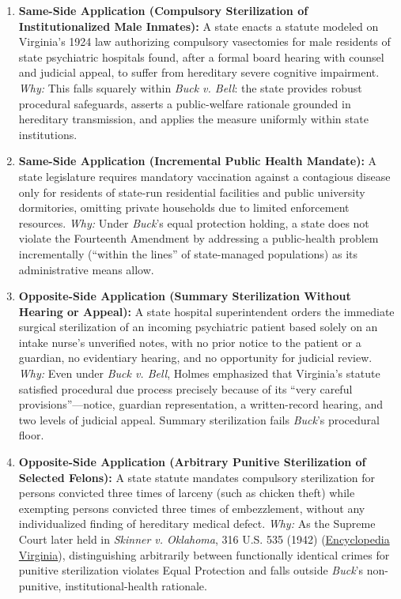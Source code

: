 \documentclass[12pt]{article}
\begin{document}
\begin{enumerate}
  \item \textbf{Same-Side Application (Compulsory Sterilization of Institutionalized Male Inmates):} A state enacts a statute modeled on Virginia's 1924 law authorizing compulsory vasectomies for male residents of state psychiatric hospitals found, after a formal board hearing with counsel and judicial appeal, to suffer from hereditary severe cognitive impairment. \textit{Why:} This falls squarely within \textit{Buck v. Bell}: the state provides robust procedural safeguards, asserts a public-welfare rationale grounded in hereditary transmission, and applies the measure uniformly within state institutions.

  \item \textbf{Same-Side Application (Incremental Public Health Mandate):} A state legislature requires mandatory vaccination against a contagious disease only for residents of state-run residential facilities and public university dormitories, omitting private households due to limited enforcement resources. \textit{Why:} Under \textit{Buck}'s equal protection holding, a state does not violate the Fourteenth Amendment by addressing a public-health problem incrementally (``within the lines'' of state-managed populations) as its administrative means allow.

  \item \textbf{Opposite-Side Application (Summary Sterilization Without Hearing or Appeal):} A state hospital superintendent orders the immediate surgical sterilization of an incoming psychiatric patient based solely on an intake nurse's unverified notes, with no prior notice to the patient or a guardian, no evidentiary hearing, and no opportunity for judicial review. \textit{Why:} Even under \textit{Buck v. Bell}, Holmes emphasized that Virginia's statute satisfied procedural due process precisely because of its ``very careful provisions''---notice, guardian representation, a written-record hearing, and two levels of judicial appeal. Summary sterilization fails \textit{Buck}'s procedural floor.

  \item \textbf{Opposite-Side Application (Arbitrary Punitive Sterilization of Selected Felons):} A state statute mandates compulsory sterilization for persons convicted three times of larceny (such as chicken theft) while exempting persons convicted three times of embezzlement, without any individualized finding of hereditary medical defect. \textit{Why:} As the Supreme Court later held in \textit{Skinner v. Oklahoma}, 316 U.S. 535 (1942) (\href{https://encyclopediavirginia.org/entries/buck-v-bell-1927/}{Encyclopedia Virginia}), distinguishing arbitrarily between functionally identical crimes for punitive sterilization violates Equal Protection and falls outside \textit{Buck}'s non-punitive, institutional-health rationale.


\end{enumerate}
\end{document}
